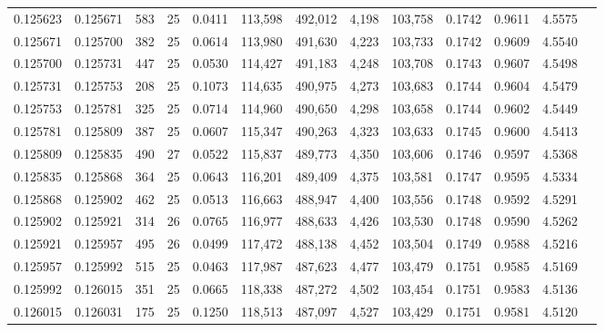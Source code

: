 \begin{tabular}{rrrrrrrrrrrrr}
0.125623 & 0.125671 &   583 &  25 &                                     0.0411 & 113,598 & 492,012 &   4,198 & 103,758 & 0.1742 & 0.9611 & 4.5575 \\
0.125671 & 0.125700 &   382 &  25 &                                     0.0614 & 113,980 & 491,630 &   4,223 & 103,733 & 0.1742 & 0.9609 & 4.5540 \\
0.125700 & 0.125731 &   447 &  25 &                                     0.0530 & 114,427 & 491,183 &   4,248 & 103,708 & 0.1743 & 0.9607 & 4.5498 \\
0.125731 & 0.125753 &   208 &  25 &                                     0.1073 & 114,635 & 490,975 &   4,273 & 103,683 & 0.1744 & 0.9604 & 4.5479 \\
0.125753 & 0.125781 &   325 &  25 &                                     0.0714 & 114,960 & 490,650 &   4,298 & 103,658 & 0.1744 & 0.9602 & 4.5449 \\
0.125781 & 0.125809 &   387 &  25 &                                     0.0607 & 115,347 & 490,263 &   4,323 & 103,633 & 0.1745 & 0.9600 & 4.5413 \\
0.125809 & 0.125835 &   490 &  27 &                                     0.0522 & 115,837 & 489,773 &   4,350 & 103,606 & 0.1746 & 0.9597 & 4.5368 \\
0.125835 & 0.125868 &   364 &  25 &                                     0.0643 & 116,201 & 489,409 &   4,375 & 103,581 & 0.1747 & 0.9595 & 4.5334 \\
0.125868 & 0.125902 &   462 &  25 &                                     0.0513 & 116,663 & 488,947 &   4,400 & 103,556 & 0.1748 & 0.9592 & 4.5291 \\
0.125902 & 0.125921 &   314 &  26 &                                     0.0765 & 116,977 & 488,633 &   4,426 & 103,530 & 0.1748 & 0.9590 & 4.5262 \\
0.125921 & 0.125957 &   495 &  26 &                                     0.0499 & 117,472 & 488,138 &   4,452 & 103,504 & 0.1749 & 0.9588 & 4.5216 \\
0.125957 & 0.125992 &   515 &  25 &                                     0.0463 & 117,987 & 487,623 &   4,477 & 103,479 & 0.1751 & 0.9585 & 4.5169 \\
0.125992 & 0.126015 &   351 &  25 &                                     0.0665 & 118,338 & 487,272 &   4,502 & 103,454 & 0.1751 & 0.9583 & 4.5136 \\
0.126015 & 0.126031 &   175 &  25 &                                     0.1250 & 118,513 & 487,097 &   4,527 & 103,429 & 0.1751 & 0.9581 & 4.5120 \\

\end{tabular}
